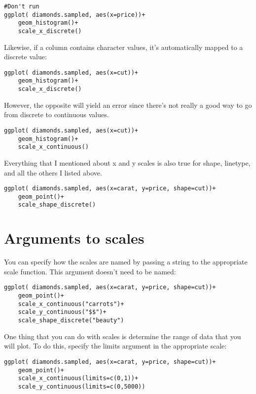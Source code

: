 \documentclass[11pt]{article}
\begin{document}
\begin{verbatim}
#Don't run
ggplot( diamonds.sampled, aes(x=price))+
    geom_histogram()+
    scale_x_discrete()
\end{verbatim}


Likewise, if a column contains character values, it's automatically
mapped to a discrete value:

\begin{verbatim}
ggplot( diamonds.sampled, aes(x=cut))+
    geom_histogram()+
    scale_x_discrete()
\end{verbatim}


However, the opposite will yield an error since there's not really a
good way to go from discrete to continuous values.

\begin{verbatim}
ggplot( diamonds.sampled, aes(x=cut))+
    geom_histogram()+
    scale_x_continuous()
\end{verbatim}


Everything that I mentioned about x and y scales is also true for
shape, linetype, and all the others I listed above.

\begin{verbatim}
ggplot( diamonds.sampled, aes(x=carat, y=price, shape=cut))+
    geom_point()+
    scale_shape_discrete()
\end{verbatim}
\section{Arguments to scales}
\label{sec-2}


You can specify how the scales are named by passing a string to the
appropriate scale function. This argument doesn't need to be named:

\begin{verbatim}
ggplot( diamonds.sampled, aes(x=carat, y=price, shape=cut))+
    geom_point()+
    scale_x_continuous("carrots")+
    scale_y_continuous("$$")+
    scale_shape_discrete("beauty")
\end{verbatim}


One thing that you can do with scales is determine the range of data
that you will plot. To do this, specify the limits argument in the
appropriate scale:

\begin{verbatim}
ggplot( diamonds.sampled, aes(x=carat, y=price, shape=cut))+
    geom_point()+
    scale_x_continuous(limits=c(0,1))+
    scale_y_continuous(limits=c(0,5000))
\end{verbatim}
\end{document}
